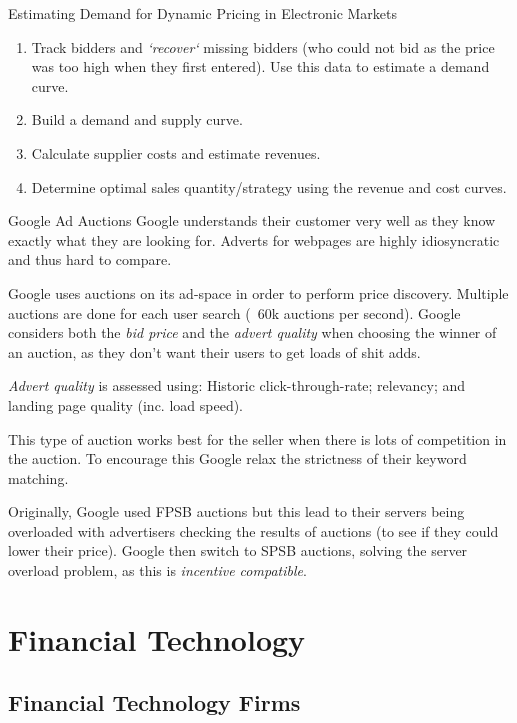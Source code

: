 \documentclass[11pt,a4paper]{article}
\begin{document}
\begin{proposition}{Estimating Demand for Dynamic Pricing in Electronic Markets}
  \begin{enumerate}
    \item Track bidders and \textit{`recover`} missing bidders (who could not bid as the price was too high when they first entered). Use this data to estimate a demand curve.
    \item Build a demand and supply curve.
    \item Calculate supplier costs and estimate revenues.
    \item Determine optimal sales quantity/strategy using the revenue and cost curves.
  \end{enumerate}
\end{proposition}

\begin{remark}{Google Ad Auctions}
  Google understands their customer very well as they know exactly what they are looking for. Adverts for webpages are highly idiosyncratic and thus hard to compare.
  \par Google uses auctions on its ad-space in order to perform price discovery. Multiple auctions are done for each user search (~60k auctions per second). Google considers both the \textit{bid price} and the \textit{advert quality} when choosing the winner of an auction, as they don't want their users to get loads of shit adds.
  \par \textit{Advert quality} is assessed using: Historic click-through-rate; relevancy; and landing page quality (inc. load speed).
  \par This type of auction works best for the seller when there is lots of competition in the auction. To encourage this Google relax the strictness of their keyword matching.
  \par Originally, Google used FPSB auctions but this lead to their servers being overloaded with advertisers checking the results of auctions (to see if they could lower their price). Google then switch to SPSB auctions, solving the server overload problem, as this is \textit{incentive compatible}.
\end{remark}

\section{Financial Technology}

\subsection{Financial Technology Firms}
\end{document}
